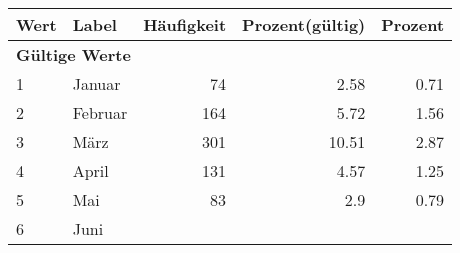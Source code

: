      \begin{longtable}{lXrrr}
     \toprule
     \textbf{Wert} & \textbf{Label} & \textbf{Häufigkeit} & \textbf{Prozent(gültig)} & \textbf{Prozent} \\
     \endhead
     \midrule
     \multicolumn{5}{l}{\textbf{Gültige Werte}}\\

     1 &
     \multicolumn{1}{X}{ Januar   } &


       \num{74} &
       \num[round-mode=places,round-precision=2]{2.58} &
         \num[round-mode=places,round-precision=2]{0.71} \\

     2 &
     \multicolumn{1}{X}{ Februar   } &


       \num{164} &
       \num[round-mode=places,round-precision=2]{5.72} &
         \num[round-mode=places,round-precision=2]{1.56} \\

     3 &
     \multicolumn{1}{X}{ März   } &


       \num{301} &
       \num[round-mode=places,round-precision=2]{10.51} &
         \num[round-mode=places,round-precision=2]{2.87} \\

     4 &
     \multicolumn{1}{X}{ April   } &


       \num{131} &
       \num[round-mode=places,round-precision=2]{4.57} &
         \num[round-mode=places,round-precision=2]{1.25} \\

     5 &
     \multicolumn{1}{X}{ Mai   } &


       \num{83} &
       \num[round-mode=places,round-precision=2]{2.9} &
         \num[round-mode=places,round-precision=2]{0.79} \\

     6 &
     \multicolumn{1}{X}{ Juni   } &



\end{longtable}
